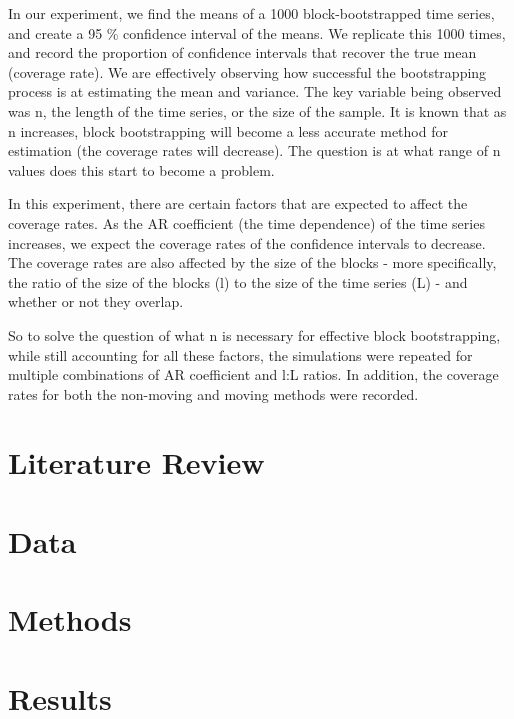 \documentclass[10pt]{article}
\begin{document}
In our experiment, we find the means of a 1000 block-bootstrapped time series, and create a 95 \% confidence interval of the means. We replicate this 1000 times, and record the proportion of confidence intervals that recover the true mean (coverage rate). We are effectively observing how successful the bootstrapping process is at estimating the mean and variance. The key variable being observed was n, the length of the time series, or the size of the sample. It is known that as n increases, block bootstrapping will become a less accurate method for estimation (the coverage rates will decrease). The question is at what range of n values does this start to become a problem. 

In this experiment, there are certain factors that are expected to affect the coverage rates. As the AR coefficient (the time dependence) of the time series increases, we expect the coverage rates of the confidence intervals to decrease. The coverage rates are also affected by the size of the blocks - more specifically, the ratio of the size of the blocks (l) to the size of the time series (L) - and whether or not they overlap.

So to solve the question of what n is necessary for effective block bootstrapping, while still accounting for all these factors, the simulations were repeated for multiple combinations of AR coefficient and l:L ratios. In addition, the coverage rates for both the non-moving and moving methods were recorded.

\section{Literature Review}





\section{Data}





\section{Methods}



\section{Results}
\end{document}
